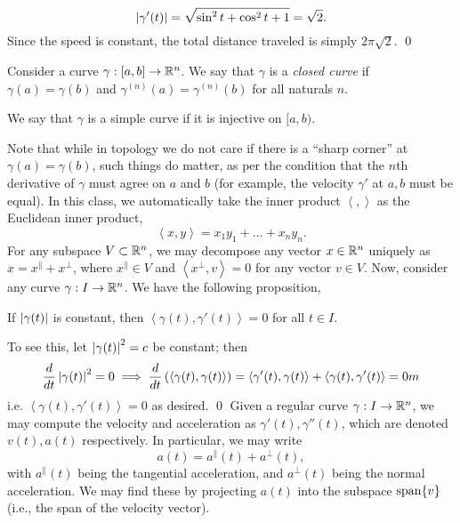 \[ \left\lvert \gamma'(t) \right\rvert = \sqrt{\sin^2 t + \cos^2 t + 1} = \sqrt{2}. \]
Since the speed is constant, the total distance traveled is simply $2\pi \sqrt{2}$. \qed
\begin{definition}
    Consider a curve $\gamma : [a, b] \to \mathbb R^n$. We say that $\gamma$ is a \textit{closed curve} if $\gamma(a) = \gamma(b)$ and $\gamma^{(n)}(a) = \gamma^{(n)}(b)$ for all naturals $n$.
\end{definition}
\begin{definition}
    We say that $\gamma$ is a simple curve if it is injective on $[a, b)$.
\end{definition}
\noindent Note that while in topology we do not care if there is a ``sharp corner'' at $\gamma(a) = \gamma(b)$, such things do matter, as per the condition that the $n$th derivative of $\gamma$ must agree on $a$ and $b$ (for example, the velocity $\gamma'$ at $a, b$ must be equal).
\medskip\newline
\noindent In this class, we automatically take the inner product $\left< , \right>$ as the Euclidean inner product,
\[ \left< x, y \right> = x_1y_1 + \dots + x_ny_n. \]
For any subspace $V \subset \mathbb R^n$, we may decompose any vector $x \in \mathbb R^n$ uniquely as $x = x^{\parallel} + x^{\perp}$, where $x^{\parallel} \in V$ and $\left<x^{\perp}, v\right> = 0$ for any vector $v \in V$. Now, consider any curve $\gamma : I \to \mathbb R^n$. We have the following proposition,
\begin{simpleprop}
    If $\left\lvert \gamma(t) \right\rvert$ is constant, then $\left< \gamma(t), \gamma'(t) \right> = 0$ for all $t \in I$.
\end{simpleprop}
\noindent To see this, let $\left\lvert \gamma(t) \right\rvert^2 = c$ be constant; then
\[ \frac{d}{dt} \left\lvert \gamma(t) \right\rvert^2 = 0 \implies \frac{d}{dt} \left(\left< \gamma(t), \gamma(t) \right>\right) = \left<\gamma'(t), \gamma(t)\right> + \left<\gamma(t), \gamma'(t)\right> = 0m \]
i.e. $\left<\gamma(t), \gamma'(t)\right> = 0$ as desired. \qed
\medskip\newline
Given a regular curve $\gamma : I \to \mathbb R^n$, we may compute the velocity and acceleration as $\gamma'(t), \gamma''(t)$, which are denoted $v(t), a(t)$ respectively. In particular, we may write
\[ a(t) = a^{\parallel}(t) + a^{\perp}(t), \]
with $a^{\parallel}(t)$ being the tangential acceleration, and $a^{\perp}(t)$ being the normal acceleration. We may find these by projecting $a(t)$ into the subspace $\operatorname{span}\{v\}$ (i.e., the span of the velocity vector).